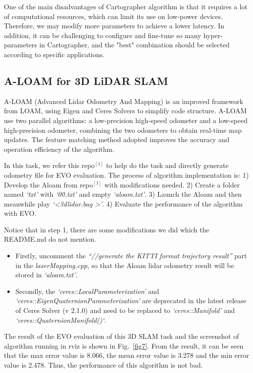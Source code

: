 \documentclass[hyperref]{article}
\theoremstyle{nonumberplain}
\begin{document}
One of the main disadvantages of Cartographer algorithm is that it requires a lot of computational resources, which can limit its use on low-power devices. Therefore, we may modify more parameters to achieve a lower latency. In addition, it can be challenging to configure and fine-tune so many hyper-parameters in Cartographer, and the "best" combination should be selected according to specific applications.

\subsection{A-LOAM for 3D LiDAR SLAM}

\hspace{1.0em}
A-LOAM (Advanced Lidar Odometry And Mapping) is an improved framework from LOAM, using Eigen and Ceres Solvers to simplify code structure. A-LOAM use two parallel algorithms: a low-precision high-speed odometer and a low-speed high-precision odometer, combining the two odometers to obtain real-time map updates. The feature matching method adopted improves the accuracy and operation efficiency of the algorithm.

In this task, we refer this repo$^{[1]}$ to help do the task and directly generate odometry file for EVO evaluation. The process of algorithm implementation is: 1) Develop the Aloam from repo$^{[1]}$ with modifications needed. 2) Create a folder named \textit{‘txt’} with \textit{‘00.txt’} and empty \textit{‘aloam.txt’}. 3) Launch the Aloam and then meanwhile play \textit{‘\textless 3dlidar.bag \textgreater’}. 4) Evaluate the performance of the algorithm with EVO.

Notice that in step 1, there are some modifications we did which the README.md do not mention. 

\begin{itemize}[itemsep=3pt,topsep=0pt,parsep=0pt]
	\item Firstly, uncomment the \textit{“//generate the KITTI format trajectory result”} part in the \textit{laserMapping.cpp}, so that the Aloam lidar odometry result will be stored in \textit{‘aloam.txt’}. 
	\item Secondly, the \textit{‘ceres::LocalParameterization’} and \textit{‘ceres::EigenQuaternionParameterization’} are deprecated in the latest release of Ceres Solver (v 2.1.0) and need to be replaced to \textit{‘ceres::Manifold’} and \textit{‘ceres::QuaternionManifold()‘}.
\end{itemize}

The result of the EVO evaluation of this 3D SLAM task and the screenshot of algorithm running in rviz is shown in Fig.~\ref{fig7}. From the result, it can be seen that the max error value is 8.066, the mean error value is 3.278 and the min error value is 2.478. Thus, the performance of this algorithm is not bad.
\end{document}
